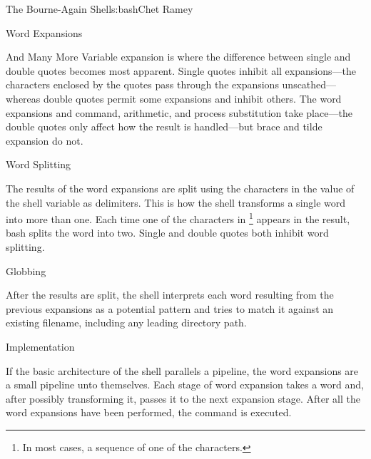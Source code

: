 \begin{aosachapter}{The Bourne-Again Shell}{s:bash}{Chet Ramey}
\begin{aosasect1}{Word Expansions}
\begin{aosasect2}{And Many More}
Variable expansion is where the difference between single and double
quotes becomes most apparent.  Single quotes inhibit all
expansions---the characters enclosed by the quotes pass through the
expansions unscathed---whereas double quotes permit some expansions
and inhibit others.  The word expansions and command, arithmetic, and
process substitution take place---the double quotes only affect how
the result is handled---but brace and tilde expansion do not.

\end{aosasect2}

\begin{aosasect2}{Word Splitting}

The results of the word expansions are split using the characters in
the value of the shell variable  as delimiters.  This is how
the shell transforms a single word into more than one.  Each time one
of the characters in \footnote{In most cases, a sequence of one
of the characters.} appears in the result, bash splits the word into
two.  Single and double quotes both inhibit word splitting.

\end{aosasect2}

\begin{aosasect2}{Globbing}

After the results are split, the shell interprets each word resulting
from the previous expansions as a potential pattern and tries to match
it against an existing filename, including any leading directory path.

\end{aosasect2}

\begin{aosasect2}{Implementation}

If the basic architecture of the shell parallels a pipeline, the word
expansions are a small pipeline unto themselves.  Each stage of word
expansion takes a word and, after possibly transforming it, passes it
to the next expansion stage.  After all the word expansions have been
performed, the command is executed.


\end{aosasect2}
\end{aosasect1}
\end{aosachapter}
